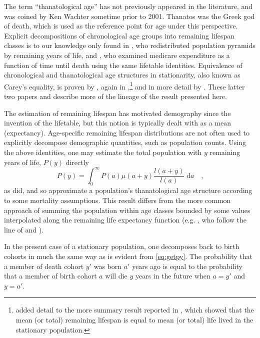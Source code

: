 \documentclass{article}
\newcommand{\dd}{\; \mathrm{d}}
\begin{document}
The term ``thanatological age'' has not previously appeared in the
literature, and was coined by Ken Wachter sometime prior to 2001. Thanatos was
the Greek god of death, which is used as the reference point for age under this
perspective. Explicit decompositions of chronological
age groups into remaining lifespan classes is to our knowledge only found in
\citet{brouard1986structure}, who redistributed
population pyramids by remaining years of life, and
\citet{miller2001increasing}, who examined medicare expenditure as a function of time until death using the
same lifetable identities. Equivalence of chronological and
thanatological age structures in stationarity, also known as Carey's equality,
is proven by \citet{brouard1989mouvements}, again in
 \citet{vaupel2009life},\footnote{\citet{vaupel2009life} added detail to the
 more summary result reported in \citet{goldstein2009life}, which showed that
 the mean (or total) remaining lifespan is equal to mean (or total) life lived in the stationary population.} and in more detail by \citet{rao2014generalization}.
These latter two papers and \citet{goldstein2012historical} describe more of the
lineage of the result presented here. 

The estimation of remaining lifespan has motivated demography since
the invention of the lifetable, but this notion is typically dealt with as a
mean (expectancy). Age-specific remaining lifespan distributions are not often
used to explicitly decompose demographic quantities, such as population counts. Using
the above identities, one may estimate the total population with $y$
remaining years of life, $P(y)$ directly
\begin{equation}
\label{eq:getpy}
P(y) = \int _0 ^\infty P(a)\mu(a+y)\frac{l(a+y)}{l(a)} \dd a \quad \text{,}
\end{equation}
\noindent as \citet{brouard1986structure} did, and so approximate a population's
thanatological age structure according to some mortality assumptions. This result differs from the more common approach
of summing the population within age classes bounded by some values interpolated
along the remaining life expectancy function (e.g.
\citet{sanderson2005average,sanderson2007new,sanderson2010remeasuring}, who
follow the line of \citet{hersch1944demographie} and \citet{ryder1975notes}).

In the present case of a stationary population, one decomposes back to birth
cohorts in much the same way as is evident from \eqref{eq:getpy}. The
probability that a member of death cohort $y'$ was born $a'$ years ago is equal to the probability that a member of birth cohort $a$ will die $y$ years in the future when $a = y'$ and $y = a'$.
\end{document}

